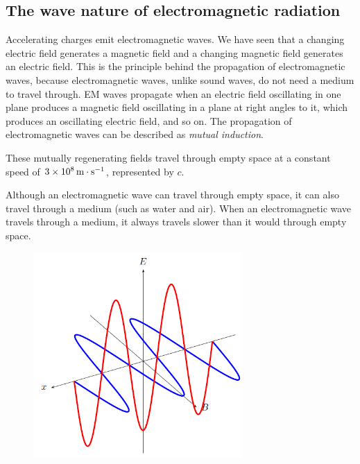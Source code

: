            \subsection{ The wave nature of electromagnetic radiation}
            \nopagebreak
      \label{m38777*id187125}Accelerating charges emit electromagnetic waves. We have seen that a changing electric field generates a magnetic field and a changing magnetic field generates an electric field. This is the principle behind the propagation of electromagnetic waves, because electromagnetic waves, unlike sound waves, do not need a medium to travel through. EM waves propagate when an electric field oscillating in one plane produces a magnetic field oscillating in a plane at right angles to it, which produces an oscillating electric field, and so on. The propagation of electromagnetic waves can be described as \textsl{mutual induction}.\par 
      \label{m38777*id187138}These mutually regenerating fields travel through empty space at a constant speed of $3\ensuremath{\times}{10}^{8}\phantom{\rule{0.166667em}{0ex}}\mathrm{m}\ensuremath{\cdot}{\mathrm{s}}^{-1}$, represented by $c$.\par 
      \label{m38777*eip-43}Although an electromagnetic wave can travel through empty space, it can also travel through a medium (such as water and air). When an electromagnetic wave travels through a medium, it always travels slower than it would through empty space.\par \label{m38777*id187191}
    \setcounter{subfigure}{0}
	\begin{figure}[H] %
    \begin{center}
    \label{m38777*id187194!!!underscore!!!media}\label{m38777*id187194!!!underscore!!!printimage}\includegraphics[width=300px]{col11305.imgs/m38777_PG12C15_001.png} %
      \vspace{2pt}
    \vspace{.1in}
    \end{center}
 \end{figure}       
